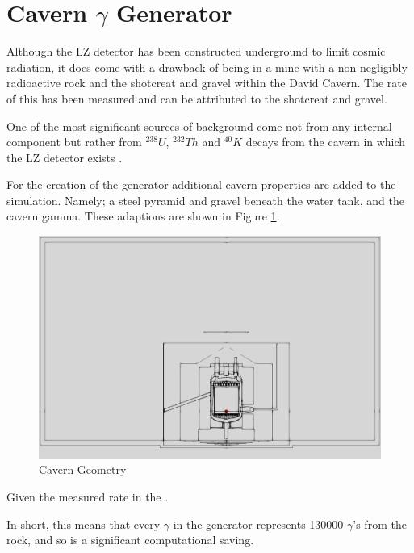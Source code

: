 \section{Cavern $\gamma$ Generator}

\par
Although the LZ detector has been constructed underground to limit cosmic radiation, it does come with a drawback of being in a mine with a non-negligibly radioactive rock and the shotcreat and gravel within the David Cavern.
The rate of this has been measured and can be attributed to the shotcreat and gravel. 

One of the most significant sources of background come not from any internal component but rather from $^{238}U$, $^{232}Th$ and $^{40}K$ decays from the cavern in which the LZ detector exists \cite{LZ_Gamma_Ray_Background_ref}.




\par
For the creation of the generator additional cavern properties are added to the simulation.
Namely; a steel pyramid and gravel beneath the water tank, and the cavern gamma. 
These adaptions are shown in Figure \ref{fig:Cavern_Geometry}.

\begin{figure}[!htbp]
\includegraphics[width=\textwidth]{Figures/Simulations/cavern_geometry_2.png}
\centering
\caption{Cavern Geometry}
\label{fig:Cavern_Geometry}
\end{figure}

\par
Given the measured rate in the .


\par
In short, this means that every $\gamma$ in the generator represents 130000 $\gamma$'s from the rock, and so is a significant computational saving.
